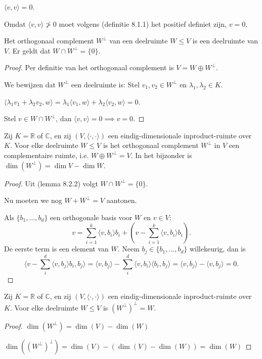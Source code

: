 \(\langle v, v \rangle = 0\).

Omdat \(\langle v, v \rangle \ngtr 0\) moet volgens (definitie 8.1.1) het positief definiet zijn, \(v=0\).


\begin{lemma}[8.2.2]
    Het orthogonaal complement $W^\perp$ van een deelruimte $W \le V$ is een deelruimte van $V$. Er geldt dat $W \cap W^\perp = \{0\}$.
\end{lemma}
\begin{proof}
    Per definitie van het orthogonaal complement is \(V = W \oplus W^\perp\).

    We bewijzen dat \(W^\perp\) een deelruimte is:
    Stel \(v_1,v_2 \in W^\perp\) en \(\lambda_1, \lambda_2 \in K\).

    \(\langle \lambda_1 v_1 + \lambda_2 v_2,w\rangle = \lambda_1 \langle  v_1  ,w\rangle + \lambda_2  \langle v_2,w\rangle = 0\).

    Stel \(v \in W \cap W^\perp\), dan \(\langle v,v \rangle = 0 \implies v = 0. \)
\end{proof}

\begin{lemma}[8.2.5]
    Zij $K = \mathbb{R}$ of $\mathbb{C}$, en zij $(V, \langle \cdot, \cdot \rangle)$ een eindig-dimensionale inproduct-ruimte over $K$. Voor elke deelruimte $W \le V$ is het orthogonaal complement $W^\perp$ in $V$ een complementaire ruimte,
    i.e. $W \oplus W^\perp = V$.
    In het bijzonder is $\dim(W^\perp) = \dim V - \dim W$.
\end{lemma}
\begin{proof}
    Uit (lemma 8.2.2) volgt  \(W \cap W^\perp = \{0\}\).
    
    Nu moeten we nog \(W + W^\perp = V\) aantonen.
    
    Als \(\{b_1, \dots, b_d\}\) een orthogonale basis voor \(W\) en \(v\in V\):
     \[v=\sum_{i=1}^{k} \langle v,b_i\rangle b_i + \left(v - \sum_{i=1}^{k} \langle v,b_i\rangle b_i \right).\]
    De eerste term is een element van \(W\). 
    Neem \(b_j \in \{b_1,\dots,b_d\}\) willekeurig, dan is
    \[
    \langle v - \sum_{i}^{d} \langle v,b_j \rangle b_i, b_j \rangle 
    = \langle v,b_j\rangle - \sum_{i}^{d} \langle v,b_i \rangle \langle b_i,b_j \rangle
    = \langle v,b_j \rangle - \langle v,b_j \rangle = 0.
    \]
\end{proof}

\begin{gevolg}[8.2.6]
    Zij $K = \mathbb{R}$ of $\mathbb{C}$, en zij $(V, \langle \cdot, \cdot \rangle)$ een eindig-dimensionale inproduct-ruimte over $K$. Voor elke deelruimte $W \le V$ is $(W^\perp)^\perp = W$.
\end{gevolg}
\begin{proof}
    \(\dim (W^\perp) = \dim(V)-\dim(W) \)

    \(\dim((W^\perp)^\perp) = \dim(V) -(\dim(V)-\dim(W)) = \dim(W)\)
\end{proof}

